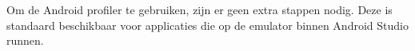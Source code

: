 Om de Android profiler te gebruiken, zijn er geen extra stappen nodig. Deze is standaard beschikbaar voor applicaties 
die op de emulator binnen Android Studio runnen.